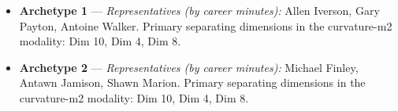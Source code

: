 \begin{itemize}
\item \textbf{Archetype 1} --- \emph{Representatives (by career minutes):} Allen Iverson, Gary Payton, Antoine Walker. Primary separating dimensions in the curvature-m2 modality: Dim 10, Dim 4, Dim 8.
\item \textbf{Archetype 2} --- \emph{Representatives (by career minutes):} Michael Finley, Antawn Jamison, Shawn Marion. Primary separating dimensions in the curvature-m2 modality: Dim 10, Dim 4, Dim 8.
\end{itemize}
